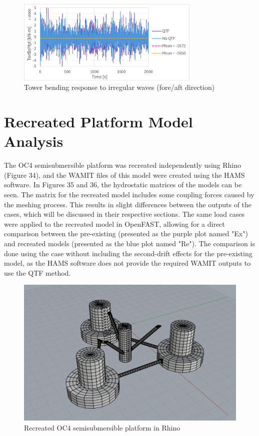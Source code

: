 \documentclass[a4paper, 11pt]{article}
\begin{document}
\begin{figure}[H]
    \centering
    \includegraphics[width=0.78\textwidth]{2.2_twr.png}
    \caption{\small Tower bending response to irregular waves (fore/aft direction)}
    \label{fig:2.2_twr}
\end{figure}

\section{Recreated Platform Model Analysis}

\hspace*{0.5cm}The OC4 semisubmersible platform was recreated independently using Rhino (Figure 34), and the WAMIT files of this model were created using the HAMS software. In Figures 35 and 36, the hydrostatic matrices of the models can be seen. The matrix for the recreated model includes some coupling forces caused by the meshing process. This results in slight differences between the outputs of the cases, which will be discussed in their respective sections. The same load cases were applied to the recreated model in OpenFAST, allowing for a direct comparison between the pre-existing (presented as the purple plot named "Ex") and recreated models (presented as the blue plot named "Re"). The comparison is done using the case without including the second-drift effects for the pre-existing model, as the HAMS software does not provide the required WAMIT outputs to use the QTF method.

\begin{figure}[H]
    \centering
    \includegraphics[width=1\textwidth]{rhino.png}
    \caption{\small Recreated OC4 semisubmersible platform in Rhino}
    \label{fig:rhino}
\end{figure}
\end{document}
